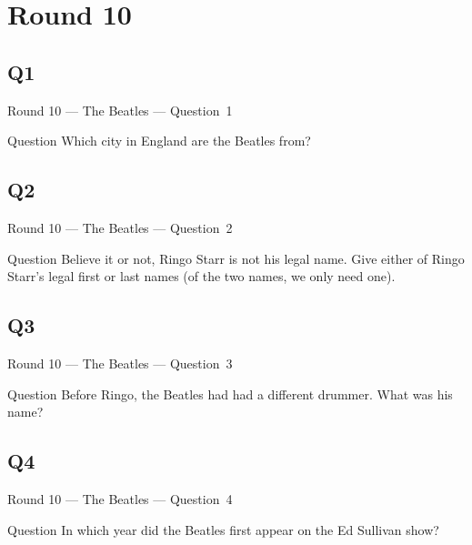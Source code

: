 \documentclass[11pt,draft]{beamer}
\begin{document}
\section{Round 10}
\subsection*{Q1}
\begin{frame}[t]{Round 10 --- The Beatles --- \mbox{Question 1}}
    \begin{block}{Question}
        Which city in England are the Beatles from?
    \end{block}
\end{frame}
\subsection*{Q2}
\begin{frame}[t]{Round 10 --- The Beatles --- \mbox{Question 2}}
    \begin{block}{Question}
        Believe it or not, Ringo Starr is not his legal name. Give either of Ringo Starr's legal first or last names (of the two names, we only need one).
    \end{block}
\end{frame}
\subsection*{Q3}
\begin{frame}[t]{Round 10 --- The Beatles --- \mbox{Question 3}}
    \begin{block}{Question}
        Before Ringo, the Beatles had had a different drummer. What was his name?
    \end{block}
\end{frame}
\subsection*{Q4}
\begin{frame}[t]{Round 10 --- The Beatles --- \mbox{Question 4}}
    \begin{block}{Question}
        In which year did the Beatles first appear on the Ed Sullivan show?
    \end{block}
\end{frame}
\end{document}
